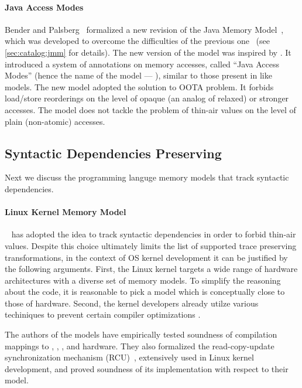 \paragraph{Java Access Modes}

Bender and Palsberg~\cite{Bender-Palsberg:OOPSLA19} formalized a new revision 
of the Java Memory Model~\cite{JDK9-VarHandle, JEP:193, JDK9-Modes}, 
which was developed to overcome 
the difficulties of the previous one~\cite{Manson-al:POPL05}
(see \ref{sec:catalog:jmm} for details).
The new version of the model was inspired by \RCMM. 
It introduced a system of annotations on memory accesses, 
called ``Java Access Modes'' (hence the name of the model --- \JAM),
similar to those present in \CMM like models.
The new model adopted the \RCMM solution to OOTA problem. 
It forbids load/store reorderings on the level of 
opaque (an analog of \CPP relaxed) or stronger accesses.
The model does not tackle the problem of 
thin-air values on the level of plain (\ie non-atomic) accesses.

\subsection{Syntactic Dependencies Preserving}
\label{sec:catalog:deprf}

Next we discuss the programming languge memory models 
that track syntactic dependencies.

\paragraph{Linux Kernel Memory Model}

\LKMM~\cite{Alglave-al:ASPLOS18} has adopted 
the idea to track syntactic dependencies in order to 
forbid thin-air values. Despite this choice 
ultimately limits the list of supported 
trace preserving transformations,
in the context of OS kernel development 
it can be justified by the following arguments. 
First, the Linux kernel targets 
a wide range of hardware architectures with a diverse
set of memory models. To simplify the reasoning about the code, 
it is reasonable to pick a model which is conceptually close
to those of hardware. 
Second, the kernel developers already utilze 
various techiniques to prevent certain compiler optimizations%
\cite{Alglave-al:ASPLOS18, LK-MemBarriers, LK-RCU-Deref}.

The authors of the models have empirically tested 
soundness of compilation mappings to 
\xTSO, , , and \POWER hardware. 
They also formalized the read-copy-update 
synchronization mechanism (RCU)~\cite{McKenney-RCU2007}, 
extensively used in Linux kernel development, 
and proved soundness of its implementation with respect to their model.

